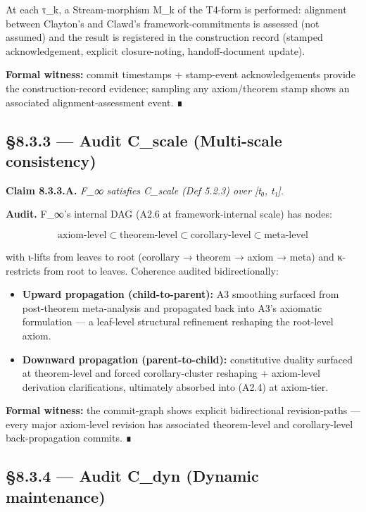 \documentclass[11pt, openany]{book}
\begin{document}
At each τ\_\allowbreak{}k, a Stream-morphism M\_\allowbreak{}k of the T4-form is performed: alignment between Clayton's and Clawd's framework-commitments is assessed (not assumed) and the result is registered in the construction record (stamped acknowledgement, explicit closure-noting, handoff-document update).

\textbf{Formal witness:} commit timestamps + stamp-event acknowledgements provide the construction-record evidence; sampling any axiom/theorem stamp shows an associated alignment-assessment event. ∎

\subsection{§8.3.3 --- Audit C\_\allowbreak{}scale (Multi-scale consistency)}

\textbf{Claim 8.3.3.A.} \textit{F\_\allowbreak{}∞ satisfies C\_\allowbreak{}scale (Def 5.2.3) over [t₀, t₁].}

\textbf{Audit.} F\_\allowbreak{}∞'s internal DAG (A2.6 at framework-internal scale) has nodes:

\[
\mathrm{axiom\text{-}level} \subset \mathrm{theorem\text{-}level} \subset \mathrm{corollary\text{-}level} \subset \mathrm{meta\text{-}level}
\]

with ι-lifts from leaves to root (corollary → theorem → axiom → meta) and κ-restricts from root to leaves. Coherence audited bidirectionally:

\begin{itemize}
\item \textbf{Upward propagation (child-to-parent):} A3 smoothing surfaced from post-theorem meta-analysis and propagated back into A3's axiomatic formulation --- a leaf-level structural refinement reshaping the root-level axiom.
\item \textbf{Downward propagation (parent-to-child):} constitutive duality surfaced at theorem-level and forced corollary-cluster reshaping + axiom-level derivation clarifications, ultimately absorbed into (A2.4) at axiom-tier.
\end{itemize}

\textbf{Formal witness:} the commit-graph shows explicit bidirectional revision-paths --- every major axiom-level revision has associated theorem-level and corollary-level back-propagation commits. ∎

\subsection{§8.3.4 --- Audit C\_\allowbreak{}dyn (Dynamic maintenance)}
\end{document}
